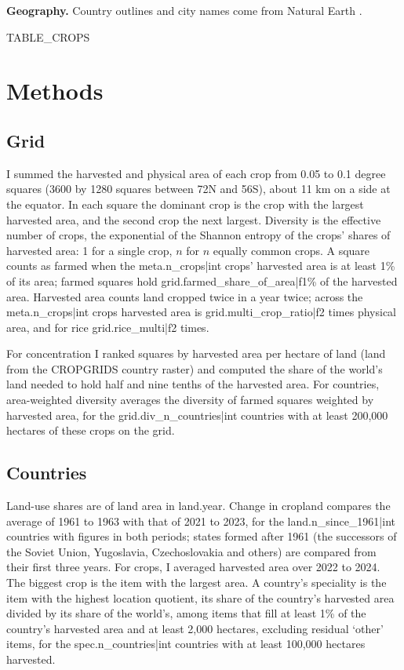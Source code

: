 \documentclass[11pt,a4paper]{article}
\begin{document}
\textbf{Geography.} Country outlines and city names come from Natural Earth \citep{naturalearth}.

{{TABLE_CROPS}}

\section{Methods}
\subsection{Grid}
I summed the harvested and physical area of each crop from 0.05 to 0.1 degree squares (3600 by 1280 squares between 72\textdegree N and 56\textdegree S), about 11 km on a side at the equator. In each square the dominant crop is the crop with the largest harvested area, and the second crop the next largest. Diversity is the effective number of crops, the exponential of the Shannon entropy of the crops' shares of harvested area: 1 for a single crop, $n$ for $n$ equally common crops. A square counts as farmed when the {{meta.n_crops|int}} crops' harvested area is at least 1\% of its area; farmed squares hold {{grid.farmed_share_of_area|f1}}\% of the harvested area. Harvested area counts land cropped twice in a year twice; across the {{meta.n_crops|int}} crops harvested area is {{grid.multi_crop_ratio|f2}} times physical area, and for rice {{grid.rice_multi|f2}} times.

For concentration I ranked squares by harvested area per hectare of land (land from the CROPGRIDS country raster) and computed the share of the world's land needed to hold half and nine tenths of the harvested area. For countries, area-weighted diversity averages the diversity of farmed squares weighted by harvested area, for the {{grid.div_n_countries|int}} countries with at least 200,000 hectares of these crops on the grid.

\subsection{Countries}
Land-use shares are of land area in {{land.year}}. Change in cropland compares the average of 1961 to 1963 with that of 2021 to 2023, for the {{land.n_since_1961|int}} countries with figures in both periods; states formed after 1961 (the successors of the Soviet Union, Yugoslavia, Czechoslovakia and others) are compared from their first three years. For crops, I averaged harvested area over 2022 to 2024. The biggest crop is the item with the largest area. A country's speciality is the item with the highest location quotient, its share of the country's harvested area divided by its share of the world's, among items that fill at least 1\% of the country's harvested area and at least 2,000 hectares, excluding residual `other' items, for the {{spec.n_countries|int}} countries with at least 100,000 hectares harvested.
\end{document}
